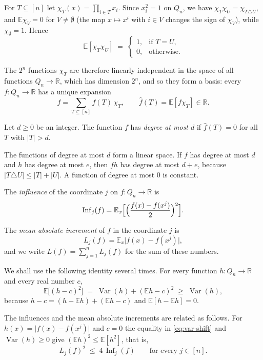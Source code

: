 \documentclass[11pt,reqno]{amsart}
\theoremstyle{definition}
\theoremstyle{remark}
\numberwithin{equation}{section}
\theoremstyle{named}
\theoremstyle{plain}
\newcommand{\R}{\mathbb{R}}
\newcommand{\E}{\mathbb{E}}
\newcommand{\Var}{\operatorname{Var}}
\newcommand{\Inf}{\operatorname{Inf}}
\newcommand{\abs}[1]{\lvert #1\rvert}
\begin{document}
For $T\subseteq[n]$ let $\chi_T(x)=\prod_{i\in T}x_i$. Since $x_i^{2}=1$ on $Q_n$, we have
$\chi_T\chi_U=\chi_{T\triangle U}$, and $\E\chi_V=0$ for $V\ne\emptyset$ (the map $x\mapsto x^{i}$
with $i\in V$ changes the sign of $\chi_V$), while $\chi_\emptyset=1$. Hence
\[
   \E[\chi_T\chi_U]\;=\;\begin{cases}1,&\text{if }T=U,\\ 0,&\text{otherwise.}\end{cases}
\]

The $2^{n}$ functions $\chi_T$ are
therefore linearly independent in the space of all functions $Q_n\to\R$, which has dimension $2^{n}$,
and so they form a basis: every $f\colon Q_n\to\R$ has a unique expansion
\begin{equation}\label{eq:expansion}
   f=\sum_{T\subseteq[n]}\hat f(T)\,\chi_T,\qquad \hat f(T)=\E[f\chi_T]\in\R .
\end{equation}

Let $d\ge0$ be an integer. The function $f$ has \emph{degree at most $d$} if $\hat f(T)=0$ for all $T$ with
$\abs{T}>d$.

The functions of degree at most $d$ form a linear space. If $f$ has degree at most $d$ and $h$ has degree at most
$e$, then $fh$ has degree at most $d+e$, because $\abs{T\triangle U}\le\abs{T}+\abs{U}$. A function of
degree at most $0$ is constant.

The \emph{influence} of the coordinate $j$ on $f\colon Q_n\to\R$ is
\[
   \Inf_j(f)=\E_x\Bigl[\Bigl(\frac{f(x)-f(x^{j})}{2}\Bigr)^{2}\Bigr].
\]

The \emph{mean absolute increment} of $f$ in the coordinate $j$ is
\[
   L_j(f)=\E_x\abs{f(x)-f(x^{j})},
\]
and we write $L(f)=\sum_{j=1}^{n}L_j(f)$ for the sum of these numbers.

We shall use the following identity several times. For every function $h\colon Q_n\to\R$ and
every real number $c$,
\begin{equation}\label{eq:var-shift}
   \E\bigl[(h-c)^{2}\bigr]\;=\;\Var(h)+(\E h-c)^{2}\;\ge\;\Var(h),
\end{equation}
because $h-c=(h-\E h)+(\E h-c)$ and $\E[h-\E h]=0$.

The influences and the mean absolute increments are related as follows. For
$h(x)=\abs{f(x)-f(x^{j})}$ and $c=0$ the
equality in \eqref{eq:var-shift} and $\Var(h)\ge0$ give $(\E h)^{2}\le\E[h^{2}]$, that is,
\begin{equation}\label{eq:L-Inf}
   L_j(f)^{2}\;\le\;4\,\Inf_j(f)\qquad\text{for every }j\in[n].
\end{equation}
\end{document}
